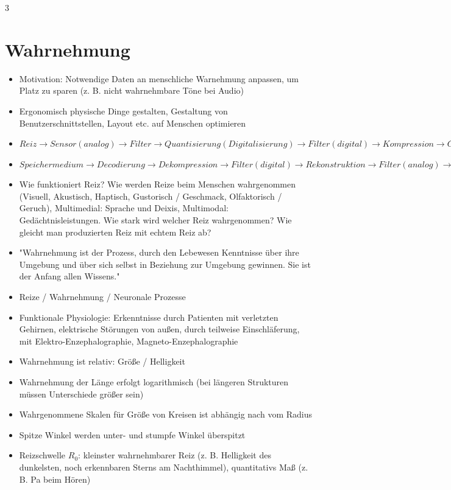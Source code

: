 \documentclass[12pt,landscape]{article}
\begin{document}
\begin{multicols}{3}
\section{Wahrnehmung}
\begin{itemize}
\item Motivation: Notwendige Daten an menschliche Warnehmung anpassen, um Platz zu sparen (z. B. nicht wahrnehmbare Töne bei Audio)
\item Ergonomisch physische Dinge gestalten, Gestaltung von Benutzerschnittstellen, Layout etc. auf Menschen optimieren
\item $Reiz \rightarrow Sensor (analog) \rightarrow Filter \rightarrow Quantisierung (Digitalisierung) \rightarrow Filter (digital) \rightarrow Kompression \rightarrow Codierung \rightarrow Speichermedium$
\item $Speichermedium \rightarrow Decodierung \rightarrow Dekompression \rightarrow Filter (digital) \rightarrow Rekonstruktion \rightarrow Filter (analog) \rightarrow Display (analog) \rightarrow Reiz (beim Mensch)$
\item Wie funktioniert Reiz? Wie werden Reize beim Menschen wahrgenommen (Visuell, Akustisch, Haptisch, Gustorisch / Geschmack, Olfaktorisch / Geruch), Multimedial: Sprache und Deixis, Multimodal: Gedächtnisleistungen. Wie stark wird welcher Reiz wahrgenommen? Wie gleicht man produzierten Reiz mit echtem Reiz ab?
\item "Wahrnehmung ist der Prozess, durch den Lebewesen Kenntnisse über ihre Umgebung und über sich selbst in Beziehung zur Umgebung gewinnen. Sie ist der Anfang allen Wissens."
\item Reize / Wahrnehmung / Neuronale Prozesse
\item Funktionale Physiologie: Erkenntnisse durch Patienten mit verletzten Gehirnen, elektrische Störungen von außen, durch teilweise Einschläferung, mit Elektro-Enzephalographie, Magneto-Enzephalographie
\item Wahrnehmung ist relativ: Größe / Helligkeit 
\item Wahrnehmung der Länge erfolgt logarithmisch (bei längeren Strukturen müssen Unterschiede größer sein)
\item Wahrgenommene Skalen für Größe von Kreisen ist abhängig nach vom Radius
\item Spitze Winkel werden unter- und stumpfe Winkel überspitzt
\item Reizschwelle $R_0$: kleinster wahrnehmbarer Reiz (z. B. Helligkeit des dunkelsten, noch erkennbaren Sterns am Nachthimmel), quantitativs Maß (z. B. Pa beim Hören) 

\end{itemize}
\end{multicols}
\end{document}
